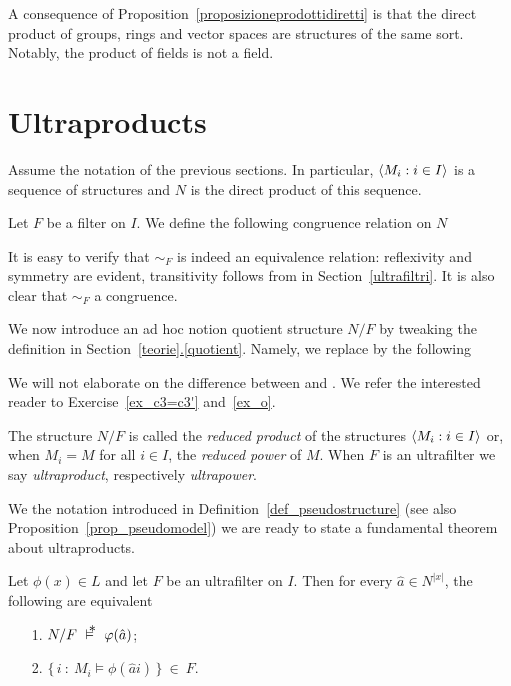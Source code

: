 \documentclass[creche.tex]{subfiles}
\begin{document}
A consequence of Proposition~\ref{proposizioneprodottidiretti} is that the direct product of groups, rings and vector spaces are structures of the same sort. Notably, the product of fields is not a field.

\section{Ultraproducts}
Assume the notation of the previous sections. In particular, $\langle M_i:i\in I\rangle$ is a sequence of structures and $N$ is the direct product of this sequence. 

Let $F$ be a filter on $I$. We define the following congruence relation on $N$


It is easy to verify that $\sim_F$ is indeed an equivalence relation: reflexivity and symmetry are evident, transitivity follows from  in Section~\ref{ultrafiltri}. It is also clear that $\sim_F$ a congruence. 

We now introduce an ad hoc notion quotient structure \emph{$N/F$\/} by tweaking the definition in Section~\hyperref[quotient]{\ref*{teorie}.\ref*{quotient}}.  Namely, we replace   by the following


We will not elaborate on the difference between  and . We refer the interested reader to Exercise~\ref{ex_c3=c3'} and~\ref{ex_o}.

The structure $N/F$ is called the \emph{reduced product\/} of the structures $\langle M_i:i\in I\rangle$ or, when $M_i=M$ for all $i\in I$, the \emph{reduced power\/} of $M$. When $F$ is an ultrafilter we say \emph{ultraproduct}, respectively \emph{ultrapower}. 


We the notation introduced in Definition~\ref{def_pseudostructure} (see also Proposition~\ref{prop_pseudomodel}) we are ready to state a fundamental theorem about ultraproducts.

\begin{void_thm}[\L o\'{s} Theorem]\label{thm_los}
Let $\phi(x)\in L$ and let $F$ be an ultrafilter on $I$. Then for every $\hat a\in N^{|x|}$, the following are equivalent
\begin{itemize}
\item[1.] $N/F\ \pmodels\ \phi(\hat a)$;
\item[2.] $\big\{\,i\ :\ M_i\models \phi(\hat a i)\,\big\}\ \in\ F$.
\end{itemize}
\end{void_thm}
\end{document}
